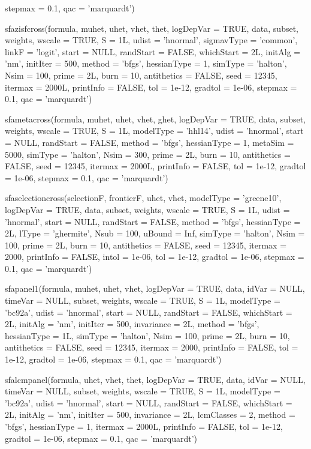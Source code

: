 \documentclass[nojss]{jss}
\begin{document}
\begin{Schunk}
\begin{Soutput}
  stepmax = 0.1, qac = 'marquardt')
\end{Soutput}
\begin{Soutput}
sfazisfcross(formula, muhet, uhet, vhet, thet, logDepVar = TRUE, data,
  subset, weights, wscale = TRUE, S = 1L, udist = 'hnormal', 
  sigmavType = 'common', linkF = 'logit', start = NULL, randStart = FALSE, 
  whichStart = 2L, initAlg = 'nm', initIter = 500, method = 'bfgs', 
  hessianType = 1, simType = 'halton', Nsim = 100, prime = 2L, burn = 10, 
  antithetics = FALSE, seed = 12345, itermax = 2000L, printInfo = FALSE, 
  tol = 1e-12, gradtol = 1e-06, stepmax = 0.1, qac = 'marquardt')
\end{Soutput}
\begin{Soutput}
sfametacross(formula, muhet, uhet, vhet, ghet, logDepVar = TRUE, data,
  subset, weights, wscale = TRUE, S = 1L, modelType = 'hhl14', udist = 'hnormal',
  start = NULL, randStart = FALSE, method = 'bfgs', hessianType = 1, 
  metaSim = 5000, simType = 'halton', Nsim = 300, prime = 2L, burn = 10, 
  antithetics = FALSE, seed = 12345, itermax = 2000L, printInfo = FALSE, 
  tol = 1e-12, gradtol = 1e-06, 
  stepmax = 0.1, qac = 'marquardt')
\end{Soutput}
\begin{Soutput}
sfaselectioncross(selectionF, frontierF, uhet, vhet, modelType = 'greene10',
  logDepVar = TRUE, data, subset, weights, wscale = TRUE, S = 1L, 
  udist = 'hnormal', start = NULL, randStart = FALSE, method = 'bfgs', 
  hessianType = 2L, lType = 'ghermite', Nsub = 100, uBound = Inf, 
  simType = 'halton', Nsim = 100, prime = 2L, burn = 10, antithetics = FALSE, 
  seed = 12345, itermax = 2000, printInfo = FALSE, intol = 1e-06, tol = 1e-12, 
  gradtol = 1e-06, stepmax = 0.1, qac = 'marquardt')
\end{Soutput}
\begin{Soutput}
sfapanel1(formula, muhet, uhet, vhet, logDepVar = TRUE, data, idVar = NULL,
  timeVar = NULL, subset, weights, wscale = TRUE, S = 1L, modelType = 'bc92a',
  udist = 'hnormal', start = NULL, randStart = FALSE, whichStart = 2L, 
  initAlg = 'nm', initIter = 500, invariance = 2L, method = 'bfgs', 
  hessianType = 1L, simType = 'halton', Nsim = 100, prime = 2L, burn = 10, 
  antithetics = FALSE, seed = 12345, itermax = 2000, printInfo = FALSE, 
  tol = 1e-12, gradtol = 1e-06, stepmax = 0.1, qac = 'marquardt')
\end{Soutput}
\begin{Soutput}
sfalcmpanel(formula, uhet, vhet, thet, logDepVar = TRUE, data, idVar = NULL,
  timeVar = NULL, subset, weights, wscale = TRUE, S = 1L, modelType = 'bc92a',
  udist = 'hnormal', start = NULL, randStart = FALSE, whichStart = 2L, 
  initAlg = 'nm', initIter = 500, invariance = 2L, lcmClasses = 2, 
  method = 'bfgs', hessianType = 1, itermax = 2000L, printInfo = FALSE, 
  tol = 1e-12, gradtol = 1e-06, stepmax = 0.1, qac = 'marquardt')
\end{Soutput}
\end{Schunk}
\end{document}
